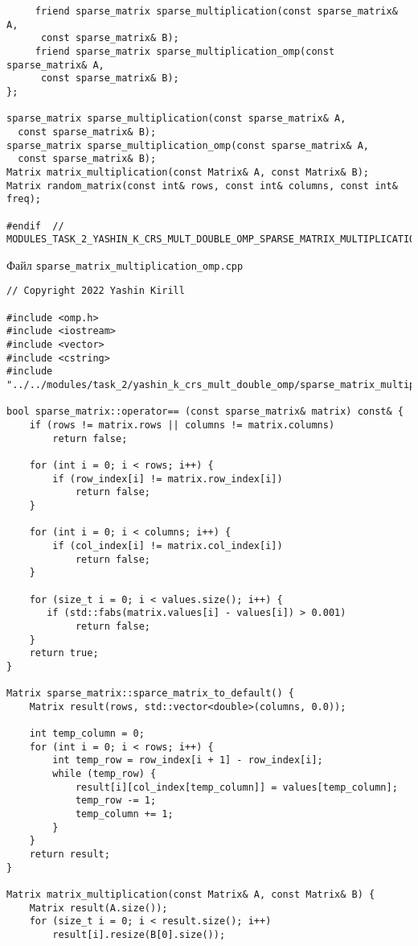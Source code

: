 \documentclass{report}
\begin{document}
\begin{lstlisting}
     friend sparse_matrix sparse_multiplication(const sparse_matrix& A,
      const sparse_matrix& B);
     friend sparse_matrix sparse_multiplication_omp(const sparse_matrix& A,
      const sparse_matrix& B);
};

sparse_matrix sparse_multiplication(const sparse_matrix& A,
  const sparse_matrix& B);
sparse_matrix sparse_multiplication_omp(const sparse_matrix& A,
  const sparse_matrix& B);
Matrix matrix_multiplication(const Matrix& A, const Matrix& B);
Matrix random_matrix(const int& rows, const int& columns, const int& freq);

#endif  // MODULES_TASK_2_YASHIN_K_CRS_MULT_DOUBLE_OMP_SPARSE_MATRIX_MULTIPLICATION_OMP_H_

\end{lstlisting}
Файл \verb|sparse_matrix_multiplication_omp.cpp|
\begin{lstlisting}
// Copyright 2022 Yashin Kirill

#include <omp.h>
#include <iostream>
#include <vector>
#include <cstring>
#include "../../modules/task_2/yashin_k_crs_mult_double_omp/sparse_matrix_multiplication_omp.h"

bool sparse_matrix::operator== (const sparse_matrix& matrix) const& {
    if (rows != matrix.rows || columns != matrix.columns)
        return false;

    for (int i = 0; i < rows; i++) {
        if (row_index[i] != matrix.row_index[i])
            return false;
    }

    for (int i = 0; i < columns; i++) {
        if (col_index[i] != matrix.col_index[i])
            return false;
    }

    for (size_t i = 0; i < values.size(); i++) {
       if (std::fabs(matrix.values[i] - values[i]) > 0.001)
            return false;
    }
    return true;
}

Matrix sparse_matrix::sparce_matrix_to_default() {
    Matrix result(rows, std::vector<double>(columns, 0.0));

    int temp_column = 0;
    for (int i = 0; i < rows; i++) {
        int temp_row = row_index[i + 1] - row_index[i];
        while (temp_row) {
            result[i][col_index[temp_column]] = values[temp_column];
            temp_row -= 1;
            temp_column += 1;
        }
    }
    return result;
}

Matrix matrix_multiplication(const Matrix& A, const Matrix& B) {
    Matrix result(A.size());
    for (size_t i = 0; i < result.size(); i++)
        result[i].resize(B[0].size());


\end{lstlisting}
\end{document}
